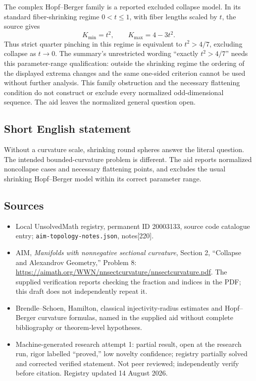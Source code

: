 \documentclass[11pt]{article}
\begin{document}
The complex Hopf--Berger family is a reported excluded collapse model. In its standard fiber-shrinking regime $0<t\leq1$, with fiber lengths scaled by $t$, the source gives
\[
 K_{\min}=t^2,\qquad K_{\max}=4-3t^2.
\]
Thus strict quarter pinching in this regime is equivalent to $t^2>4/7$, excluding collapse as $t\to0$. The summary's unrestricted wording ``exactly $t^2>4/7$'' needs this parameter-range qualification: outside the shrinking regime the ordering of the displayed extrema changes and the same one-sided criterion cannot be used without further analysis. This family obstruction and the necessary flattening condition do not construct or exclude every normalized odd-dimensional sequence. The aid leaves the normalized general question open.
\subsection{Short English statement}
Without a curvature scale, shrinking round spheres answer the literal question. The intended bounded-curvature problem is different. The aid reports normalized noncollapse cases and necessary flattening points, and excludes the usual shrinking Hopf--Berger model within its correct parameter range.
\subsection{Sources}
\begin{itemize}
\item Local UnsolvedMath registry, permanent ID 20003133, source code catalogue entry; \texttt{aim-topology-notes.json}, notes[220].
\item AIM, \emph{Manifolds with nonnegative sectional curvature}, Section 2, ``Collapse and Alexandrov Geometry,'' Problem 8: \url{https://aimath.org/WWN/nnsectcurvature/nnsectcurvature.pdf}. The supplied verification reports checking the fraction and indices in the PDF; this draft does not independently repeat it.
\item Brendle--Schoen, Hamilton, classical injectivity-radius estimates and Hopf--Berger curvature formulas, named in the supplied aid without complete bibliography or theorem-level hypotheses.
\item Machine-generated research attempt 1: partial result, open at the research run, rigor labelled ``proved,'' low novelty confidence; registry partially solved and corrected verified statement. Not peer reviewed; independently verify before citation. Registry updated 14 August 2026.
\end{itemize}
\end{document}
